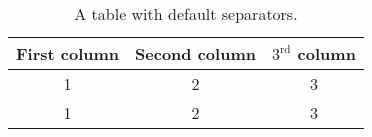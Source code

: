 \begin{table}[h]
    \centering
    \caption{A table with default separators.}
    \begin{tabular}{ccc}
        \hline
        First column & Second column & $\mathrm{3^{rd}}$ column
        \tabularnewline\hline
        1 & 2 & 3
        \tabularnewline
        1 & 2 & 3
        \tabularnewline\hline
    \end{tabular}
    \label{tab:table1}
\end{table}
